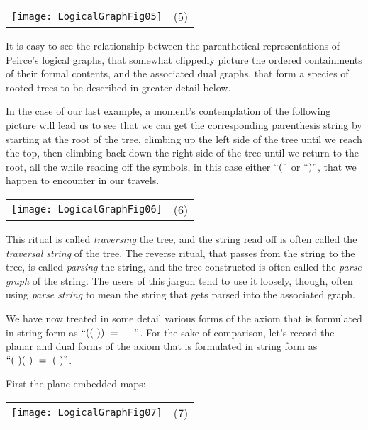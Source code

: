 \documentclass[12pt]{article}
\begin{document}
\begin{center}\begin{tabular}{cc}
\texttt{[image: LogicalGraphFig05]} & (5) \\
\end{tabular}\end{center}

It is easy to see the relationship between the parenthetical representations of Peirce's logical graphs, that somewhat clippedly picture the ordered containments of their formal contents, and the associated dual graphs, that form a species of rooted trees to be described in greater detail below.

In the case of our last example, a moment's contemplation of the following picture will lead us to see that we can get the corresponding parenthesis string by starting at the root of the tree, climbing up the left side of the tree until we reach the top, then climbing back down the right side of the tree until we return to the root, all the while reading off the symbols, in this case either $``("$ or $``)"$, that we happen to encounter in our travels.

\begin{center}\begin{tabular}{cc}
\texttt{[image: LogicalGraphFig06]} & (6) \\
\end{tabular}\end{center}

This ritual is called \textit{traversing} the tree, and the string read off is often called the \textit{traversal string} of the tree.  The reverse ritual, that passes from the string to the tree, is called \textit{parsing} the string, and the tree constructed is often called the \textit{parse graph} of the string.  The users of this jargon tend to use it loosely, though, often using \textit{parse string} to mean the string that gets parsed into the associated graph.

We have now treated in some detail various forms of the axiom that is formulated in string form as $``((~))~=~~~~"$.  For the sake of comparison, let's record the planar and dual forms of the axiom that is formulated in string form as $``(~)(~)~=~(~)"$.

First the plane-embedded maps:

\begin{center}\begin{tabular}{cc}
\texttt{[image: LogicalGraphFig07]} & (7) \\
\end{tabular}\end{center}
\end{document}
